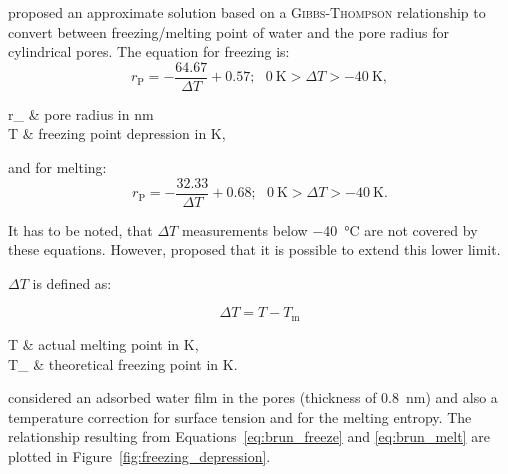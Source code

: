 \textcite{brun.1977} proposed an approximate solution based on a \textsc{Gibbs-Thompson} relationship to convert between freezing/melting point of water and the pore radius for cylindrical pores.
The equation for freezing is:
\begin{equation}
	r_\text{P} = -\frac{64.67}{\Delta T }+0.57;~~~\SI{0}{\kelvin} > \Delta T > \SI{-40}{\kelvin},
	\label{eq:brun_freeze}
\end{equation}
\begin{conditions}
	r_ & pore radius in \si{\nano\meter}\\
	\Delta T  &  freezing point depression in \si{\kelvin},
\end{conditions}

and for melting:
\begin{equation}
	r_\text{P} = -\frac{32.33}{\Delta T }+0.68;~~~\SI{0}{\kelvin} > \Delta T > \SI{-40}{\kelvin}.
	\label{eq:brun_melt}
\end{equation}

It has to be noted, that $\Delta T$ measurements below \SI{-40}{\celsius} are not covered by these equations.
However, \textcite{kloetstra.1995} proposed that it is possible to extend this lower limit.

$\Delta T$ is defined as:

\begin{equation}
	\Delta T = T - T_\text{m}
	\label{eq:brun_dT}
\end{equation}
\begin{conditions}
	T          &   actual melting point in \si{\kelvin}, \\
	T_ &   theoretical freezing point in \si{\kelvin}.
\end{conditions}

\textcite{brun.1977} considered an adsorbed water film in the pores (thickness of \SI{.8}{\nano\meter}) and also a temperature correction for surface tension and for the melting entropy.
The relationship resulting from Equations~\ref{eq:brun_freeze} and \ref{eq:brun_melt} are plotted in Figure~\ref{fig:freezing_depression}.

